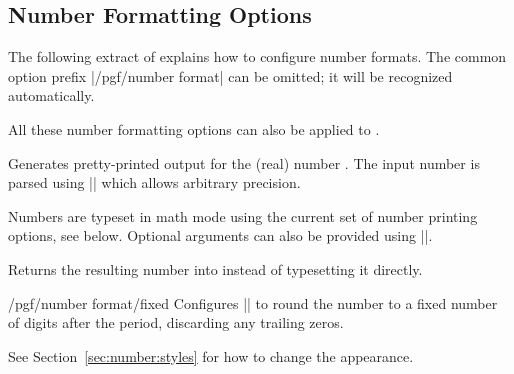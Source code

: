 \subsection{Number Formatting Options}
\label{sec:number:printing}

The following extract of \cite{tikz} explains how to configure number formats.
The common option prefix |/pgf/number format| can be omitted; it will be
recognized automatically.

All these number formatting options can also be applied to \PGFPlots{}.

\begin{command}{\pgfmathprintnumber{}}
    Generates pretty-printed output for the (real) number . The input
    number  is parsed using |\pgfmathfloatparsenumber| which allows
    arbitrary precision.

    Numbers are typeset in math mode using the current set of number printing
    options, see below. Optional arguments can also be provided using
    ||.
\end{command}

\begin{command}{\pgfmathprintnumberto{}}
    Returns the resulting number into  instead of
    typesetting it directly.
\end{command}

\begin{key}{/pgf/number format/fixed}
    Configures |\pgfmathprintnumber| to round the number to a fixed number of
    digits after the period, discarding any trailing zeros.
\begin{codeexample}[pre={\begin{lateximage}},post={\end{lateximage}}]
\hspace{1em}
\hspace{1em}
\hspace{1em}
\hspace{1em}
\end{codeexample}

    See Section~\ref{sec:number:styles} for how to change the appearance.
\end{key}

